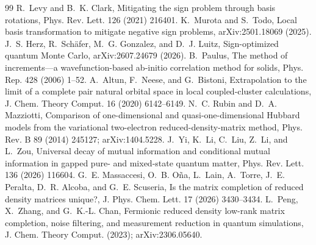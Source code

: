\documentclass[11pt]{article}
\theoremstyle{definition}
\begin{document}
\begin{thebibliography}{99}
 R.~Levy and B.~K. Clark, Mitigating the sign problem through basis rotations, Phys. Rev. Lett. 126 (2021) 216401.
 K.~Murota and S.~Todo, Local basis transformation to mitigate negative sign problems, arXiv:2501.18069 (2025).
 J.~S. Herz, R.~Sch\"afer, M.~G. Gonzalez, and D.~J. Luitz, Sign-optimized quantum Monte Carlo, arXiv:2607.24679 (2026).
 B.~Paulus, The method of increments---a wavefunction-based ab-initio correlation method for solids, Phys. Rep. 428 (2006) 1--52.
 A.~Altun, F.~Neese, and G.~Bistoni, Extrapolation to the limit of a complete pair natural orbital space in local coupled-cluster calculations, J. Chem. Theory Comput. 16 (2020) 6142--6149.
 N.~C. Rubin and D.~A. Mazziotti, Comparison of one-dimensional and quasi-one-dimensional Hubbard models from the variational two-electron reduced-density-matrix method, Phys. Rev. B 89 (2014) 245127; arXiv:1404.5228.
 J.~Yi, K.~Li, C.~Liu, Z.~Li, and L.~Zou, Universal decay of mutual information and conditional mutual information in gapped pure- and mixed-state quantum matter, Phys. Rev. Lett. 136 (2026) 116604.
 G.~E. Massaccesi, O.~B. O\~na, L.~Lain, A.~Torre, J.~E. Peralta, D.~R. Alcoba, and G.~E. Scuseria, Is the matrix completion of reduced density matrices unique?, J. Phys. Chem. Lett. 17 (2026) 3430--3434.
 L.~Peng, X.~Zhang, and G.~K.-L. Chan, Fermionic reduced density low-rank matrix completion, noise filtering, and measurement reduction in quantum simulations, J. Chem. Theory Comput. (2023); arXiv:2306.05640.
\end{thebibliography}
\end{document}
